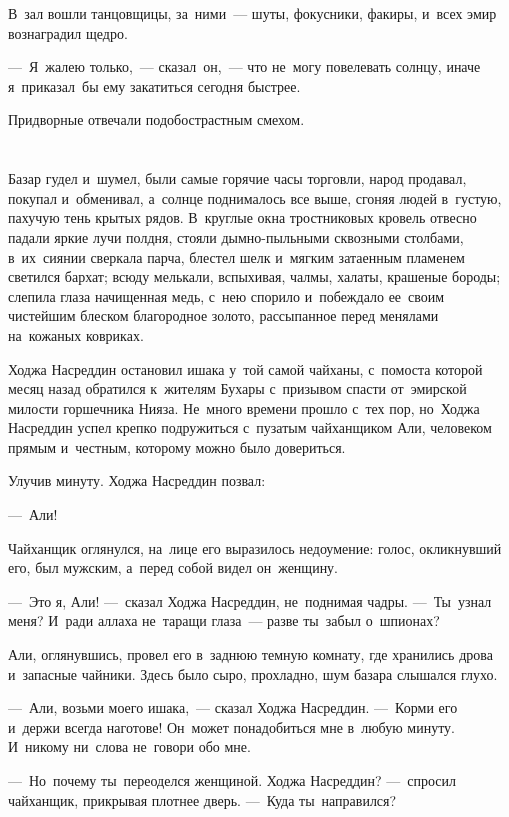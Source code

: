\documentclass[12pt,a4paper]{book}
\begin{document}
В~зал вошли танцовщицы, за~ними~— шуты, фокусники, факиры, и~всех эмир вознаградил щедро.

—~Я~жалею только,~— сказал~он,~— что не~могу повелевать солнцу, иначе я~приказал~бы ему закатиться сегодня быстрее.

Придворные отвечали подобострастным смехом.


\chapter{}

Базар гудел и~шумел, были самые горячие часы торговли, народ продавал, покупал и~обменивал, а~солнце поднималось все выше, сгоняя людей в~густую, пахучую тень крытых рядов. В~круглые окна тростниковых кровель отвесно падали яркие лучи полдня, стояли дымно-пыльными сквозными столбами, в~их~сиянии сверкала парча, блестел шелк и~мягким затаенным пламенем светился бархат; всюду мелькали, вспыхивая, чалмы, халаты, крашеные бороды; слепила глаза начищенная медь, с~нею спорило и~побеждало ее~своим чистейшим блеском благородное золото, рассыпанное перед менялами на~кожаных ковриках.

Ходжа Насреддин остановил ишака у~той самой чайханы, с~помоста которой месяц назад обратился к~жителям Бухары с~призывом спасти от~эмирской милости горшечника Нияза. Не~много времени прошло с~тех пор, но~Ходжа Насреддин успел крепко подружиться с~пузатым чайханщиком Али, человеком прямым и~честным, которому можно было довериться.

Улучив минуту. Ходжа Насреддин позвал:

—~Али!

Чайханщик оглянулся, на~лице его выразилось недоумение: голос, окликнувший его, был мужским, а~перед собой видел он~женщину.

—~Это я, Али! —~сказал Ходжа Насреддин, не~поднимая чадры. —~Ты~узнал меня? И~ради аллаха не~таращи глаза~— разве ты~забыл о~шпионах?

Али, оглянувшись, провел его в~заднюю темную комнату, где хранились дрова и~запасные чайники. Здесь было сыро, прохладно, шум базара слышался глухо.

—~Али, возьми моего ишака,~— сказал Ходжа Насреддин. —~Корми его и~держи всегда наготове! Он~может понадобиться мне в~любую минуту. И~никому ни~слова не~говори обо мне.

—~Но~почему ты~переоделся женщиной. Ходжа Насреддин? —~спросил чайханщик, прикрывая плотнее дверь. —~Куда ты~направился?
\end{document}
